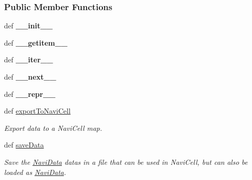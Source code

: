 \subsubsection*{Public Member Functions}
\begin{DoxyCompactItemize}
\item 
\hypertarget{classnavicom_1_1navidata_1_1NaviData_a7daecf05013e46441e7a2d2c935e7a87}{
def {\bfseries \_\-\_\-init\_\-\_\-}}
\label{classnavicom_1_1navidata_1_1NaviData_a7daecf05013e46441e7a2d2c935e7a87}

\item 
\hypertarget{classnavicom_1_1navidata_1_1NaviData_aa01878cdfddf20a588a5ecb48aed373d}{
def {\bfseries \_\-\_\-getitem\_\-\_\-}}
\label{classnavicom_1_1navidata_1_1NaviData_aa01878cdfddf20a588a5ecb48aed373d}

\item 
\hypertarget{classnavicom_1_1navidata_1_1NaviData_a840a803d8e1057ef6702283e8c3033ec}{
def {\bfseries \_\-\_\-iter\_\-\_\-}}
\label{classnavicom_1_1navidata_1_1NaviData_a840a803d8e1057ef6702283e8c3033ec}

\item 
\hypertarget{classnavicom_1_1navidata_1_1NaviData_a45175594977364139b3ad8d0f20db010}{
def {\bfseries \_\-\_\-next\_\-\_\-}}
\label{classnavicom_1_1navidata_1_1NaviData_a45175594977364139b3ad8d0f20db010}

\item 
\hypertarget{classnavicom_1_1navidata_1_1NaviData_a5780b453b33b2f60b9e1dce6d204c545}{
def {\bfseries \_\-\_\-repr\_\-\_\-}}
\label{classnavicom_1_1navidata_1_1NaviData_a5780b453b33b2f60b9e1dce6d204c545}

\item 
def \hyperlink{classnavicom_1_1navidata_1_1NaviData_a485fbc0ffff49b94f3736b2a0f8cb54e}{exportToNaviCell}
\begin{DoxyCompactList}\small\item\em Export data to a NaviCell map. \item\end{DoxyCompactList}\item 
def \hyperlink{classnavicom_1_1navidata_1_1NaviData_a3dfc92056e5fc254e80607cef39234bf}{saveData}
\begin{DoxyCompactList}\small\item\em Save the \hyperlink{classnavicom_1_1navidata_1_1NaviData}{NaviData} datas in a file that can be used in NaviCell, but can also be loaded as \hyperlink{classnavicom_1_1navidata_1_1NaviData}{NaviData}. \item\end{DoxyCompactList}\end{DoxyCompactItemize}
